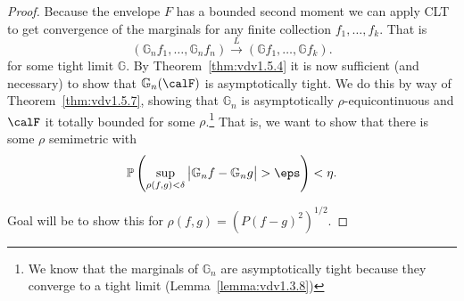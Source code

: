 \begin{proof}
	Because the envelope \(F\) has a bounded second moment we can apply CLT to get convergence of the marginals for any finite collection \(f_1,\dots,f_k\). That is
	\[
		\left(\mathbb{G}_n f_1,\dots,\mathbb{G}_n f_n\right) \overset{L}{\to}\left(\mathbb{G}f_1,\dots,\mathbb{G}f_k\right)
	.\] 
	for some tight limit \(\mathbb{G}\). By Theorem~\ref{thm:vdv1.5.4} it is now sufficient (and necessary) to show that \(\mathbb{G}_n(\calF)\) is asymptotically tight. We do this by way of Theorem~\ref{thm:vdv1.5.7}, showing that \(\mathbb{G}_n\) is asymptotically \(\rho\)-equicontinuous and \(\calF\) it totally bounded for some \(\rho\).\footnote{We know that the marginals of \(\mathbb{G}_n\) are asymptotically tight because they converge to a tight limit (Lemma~\ref{lemma:vdv1.3.8})} That is, we want to show that there is some \(\rho\) semimetric with 
	 \[
		 \P\left(\sup_{\rho(f,g)<\delta}\big|\mathbb{G}_nf-\mathbb{G}_ng\big|>\eps\right)<\eta
	.\] 
	
	Goal will be to show this for \(\rho(f,g) = \left(P(f-g)^2\right)^{1/2}\). 


\end{proof}
